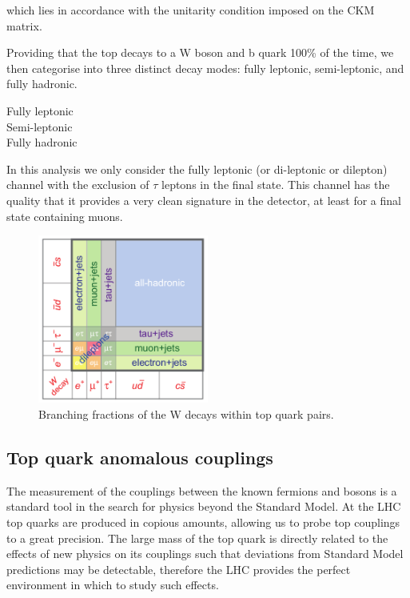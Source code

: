 which lies in accordance with the unitarity condition imposed on the CKM matrix. 

Providing that the top decays to a W boson and b quark 100\% of the time, we then categorise into three distinct decay modes: fully leptonic, semi-leptonic, and fully hadronic. 

\begin{description}
	\item[Fully leptonic]
	\item[Semi-leptonic]
	\item[Fully hadronic]
\end{description}

In this analysis we only consider the fully leptonic (or di-leptonic or dilepton) channel with the exclusion of $\tau$ leptons in the final state. This channel has the quality that it provides a very clean signature in the detector, at least for a final state containing muons. 

\begin{figure} \label{fig-ttbarDecay}
\begin{center}
\includegraphics[width=0.5\textwidth]{Figures/ttbarDecayFractions.png}
\caption{Branching fractions of the W decays within top quark pairs. \cite{ttbarDecayFractions}}
\end{center}
\end{figure}

\subsection{Top quark anomalous couplings}

The measurement of the couplings between the known fermions and bosons is a standard tool in the search for physics beyond the Standard Model. At the LHC top quarks are produced in copious amounts, allowing us to probe top couplings to a great precision. The large mass of the top quark is directly related to the effects of new physics on its couplings such that deviations from Standard Model predictions may be detectable, therefore the LHC provides the perfect environment in which to study such effects.

